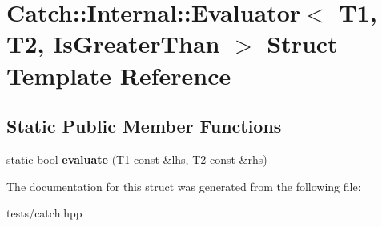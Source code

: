 \hypertarget{struct_catch_1_1_internal_1_1_evaluator_3_01_t1_00_01_t2_00_01_is_greater_than_01_4}{}\section{Catch\+:\+:Internal\+:\+:Evaluator$<$ T1, T2, Is\+Greater\+Than $>$ Struct Template Reference}
\label{struct_catch_1_1_internal_1_1_evaluator_3_01_t1_00_01_t2_00_01_is_greater_than_01_4}
\subsection*{Static Public Member Functions}
\begin{DoxyCompactItemize}
\item 
\mbox{\label{struct_catch_1_1_internal_1_1_evaluator_3_01_t1_00_01_t2_00_01_is_greater_than_01_4_a55745f74f09ac5c61bd3d592ca5560af}} 
static bool {\bfseries evaluate} (T1 const \&lhs, T2 const \&rhs)
\end{DoxyCompactItemize}


The documentation for this struct was generated from the following file\+:\begin{DoxyCompactItemize}
\item 
tests/catch.\+hpp\end{DoxyCompactItemize}

